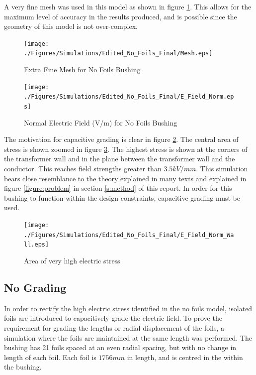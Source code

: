 A very fine mesh was used in this model as shown in figure \ref{Figure:No_Foil_Mesh}. This allows for the maximum level of accuracy in the results produced, and is possible since the geometry of this model is not over-complex.
\begin{figure}[!h]
  \centering
    \texttt{[image: ./Figures/Simulations/Edited\_No\_Foils\_Final/Mesh.eps]} 
	\caption{Extra Fine Mesh for No Foils Bushing}
\label{Figure:No_Foil_Mesh}
\end{figure}


\begin{figure}[!h]
  \centering
    \texttt{[image: ./Figures/Simulations/Edited\_No\_Foils\_Final/E\_Field\_Norm.eps]} 
	\caption{Normal Electric Field (V/m) for No Foils Bushing}
\label{Figure:No_Foil_Field}
\end{figure}


The motivation for capacitive grading is clear in figure \ref{Figure:No_Foil_Field}. 
The central area of stress is shown zoomed in figure \ref{figure:problemfield}.
The highest stress is shown at the corners of the transformer wall and in the plane between the transformer wall and the conductor.
This reaches field strengths greater than $3.5kV/mm$.
This simulation bears close resemblance to the theory explained in many texts and explained in figure \ref{figure:problem} in section \ref{s:method} of this report.
In order for this bushing to function within the design constraints, capacitive grading must be used.

\begin{figure}[!h]
   \centering
   \texttt{[image: ./Figures/Simulations/Edited\_No\_Foils\_Final/E\_Field\_Norm\_Wall.eps]}
   \caption{Area of very high electric stress}
   \label{figure:problemfield}
\end{figure}

\subsection{No Grading}
In order to rectify the high electric stress identified in the no foils model, isolated foils are introduced to capacitively grade the electric field.
To prove the requirement for grading the lengths or radial displacement of the foils, a simulation where the foils are maintained at the same length was performed.
The bushing has 21 foils spaced at an even radial spacing, but with no change in length of each foil.
Each foil is $1756mm$ in length, and is centred in the within the bushing. 

